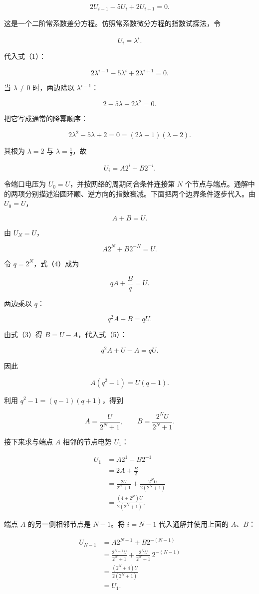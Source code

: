\documentclass[12pt,a4paper,UTF8]{ctexart}
\begin{document}
\[2U_{i-1}-5U_i+2U_{i+1}=0. \tag{1}\]

这是一个二阶常系数差分方程。仿照常系数微分方程的指数试探法，令

\[U_i=\lambda^i.\]

代入式（1）：

\[2\lambda^{i-1}-5\lambda^i+2\lambda^{i+1}=0.\]

当 \(\lambda\neq0\) 时，两边除以 \(\lambda^{i-1}\)：

\[2-5\lambda+2\lambda^2=0.\]

把它写成通常的降幂顺序：

\[2\lambda^2-5\lambda+2=0
=(2\lambda-1)(\lambda-2).\]

其根为 \(\lambda=2\) 与 \(\lambda=\frac12\)，故

\[U_i=A2^i+B2^{-i}. \tag{2}\]

令端口电压为 \(U_0=U\)，并按网络的周期闭合条件连接第 \(N\)
个节点与端点。通解中的两项分别描述沿圆环顺、逆方向的指数衰减。下面把两个边界条件逐步代入。由
\(U_0=U\)，

\[A+B=U. \tag{3}\]

由 \(U_N=U\)，

\[A2^N+B2^{-N}=U. \tag{4}\]

令 \(q=2^N\)，式（4）成为

\[qA+\frac Bq=U.\]

两边乘以 \(q\)：

\[q^2A+B=qU. \tag{5}\]

由式（3）得 \(B=U-A\)，代入式（5）：

\[q^2A+U-A=qU.\]

因此

\[A(q^2-1)=U(q-1).\]

利用 \(q^2-1=(q-1)(q+1)\)，得到

\[A=\frac{U}{2^N+1},\qquad
B=\frac{2^NU}{2^N+1}.\]

接下来求与端点 \(A\) 相邻的节点电势 \(U_1\)：

\[\begin{aligned}
U_1
&=A2^1+B2^{-1}\\
&=2A+\frac B2\\
&=\frac{2U}{2^N+1}
+\frac{2^NU}{2(2^N+1)}\\
&=\frac{(4+2^N)U}{2(2^N+1)}.
\end{aligned}\]

端点 \(A\) 的另一侧相邻节点是 \(N-1\)。将 \(i=N-1\) 代入通解并使用上面的
\(A\)、\(B\)：

\[\begin{aligned}
U_{N-1}
&=A2^{N-1}+B2^{-(N-1)}\\
&=\frac{2^{N-1}U}{2^N+1}
+\frac{2^NU}{2^N+1}\,2^{-(N-1)}\\
&=\frac{(2^N+4)U}{2(2^N+1)}\\
&=U_1.
\end{aligned}\]
\end{document}
